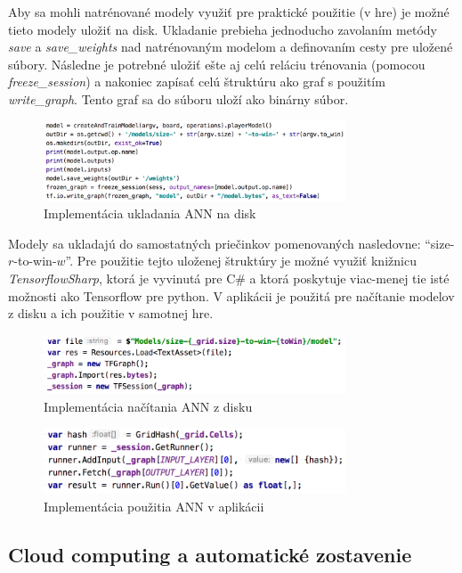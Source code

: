 Aby sa mohli natrénované modely využiť pre praktické použitie (v hre) je možné tieto modely uložiť na disk.
Ukladanie prebieha jednoducho zavolaním metódy \emph{save} a \emph{save\_weights} nad natrénovaným modelom a definovaním
cesty pre uložené súbory.
Následne je potrebné uložiť ešte aj celú reláciu trénovania (pomocou \emph{freeze\_session}) a nakoniec zapísať celú
štruktúru ako graf s použitím \emph{write\_graph}.
Tento graf sa do súboru uloží ako binárny súbor.
\begin{figure}[H]
    \centering
    \includegraphics[width=0.8\textwidth]{images/impl-ann-save.png}
    \caption{Implementácia ukladania ANN na disk}
\end{figure}\label{figure:ann-save-impl}
Modely sa ukladajú do samostatných priečinkov pomenovaných nasledovne: \enquote{size-$r$-to-win-$w$}.
Pre použitie tejto uloženej štruktúry je možné využiť knižnicu \emph{TensorflowSharp}, ktorá je vyvinutá pre C\# a ktorá
poskytuje viac-menej tie isté možnosti ako Tensorflow pre python.
V aplikácii je použitá pre načítanie modelov z disku a ich použitie v samotnej hre.
\begin{figure}[H]
    \centering
    \includegraphics[width=0.8\textwidth]{images/impl-ann-load.png}
    \caption{Implementácia načítania ANN z disku}
\end{figure}\label{figure:ann-load-impl}
\begin{figure}[H]
    \centering
    \includegraphics[width=0.8\textwidth]{images/impl-ann-usage.png}
    \caption{Implementácia použitia ANN v aplikácii}
\end{figure}\label{figure:ann-usage-impl}

\subsection{Cloud computing a automatické zostavenie}\label{subsec:ci}

